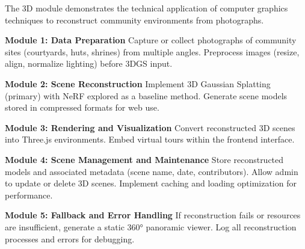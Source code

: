 The 3D module demonstrates the technical application of computer graphics techniques to reconstruct community environments from photographs.


\begin{outline}
  \1 \textbf{Module 1: Data Preparation}
    \2 Capture or collect photographs of community sites (courtyards, huts, shrines) from multiple angles.
    \2 Preprocess images (resize, align, normalize lighting) before 3DGS input.

  \1 \textbf{Module 2: Scene Reconstruction}
    \2 Implement 3D Gaussian Splatting (primary) with NeRF explored as a baseline method.
    \2 Generate scene models stored in compressed formats for web use.

  \1 \textbf{Module 3: Rendering and Visualization}
    \2 Convert reconstructed 3D scenes into Three.js environments.
    \2 Embed virtual tours within the frontend interface.

  \1 \textbf{Module 4: Scene Management and Maintenance}
    \2 Store reconstructed models and associated metadata (scene name, date, contributors).
    \2 Allow admin to update or delete 3D scenes.
    \2 Implement caching and loading optimization for performance.

  \1 \textbf{Module 5: Fallback and Error Handling}
    \2 If reconstruction fails or resources are insufficient, generate a static 360° panoramic viewer.
    \2 Log all reconstruction processes and errors for debugging.
\end{outline}

